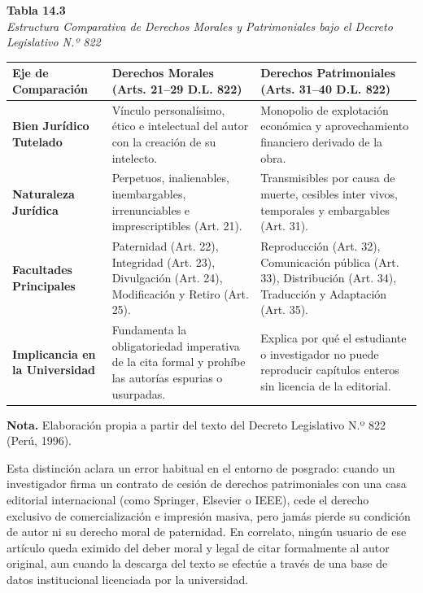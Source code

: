 \begin{table}[htbp]
\centering
\small
\renewcommand{\arraystretch}{1.25}
\textbf{Tabla 14.3}\\[0.15cm]
\textit{Estructura Comparativa de Derechos Morales y Patrimoniales bajo el Decreto Legislativo N.º 822}\\[0.25cm]
\begin{tabularx}{\textwidth}{p{3.0cm}X X}
\toprule
\textbf{Eje de Comparación} & \textbf{Derechos Morales (Arts. 21--29 D.L. 822)} & \textbf{Derechos Patrimoniales (Arts. 31--40 D.L. 822)} \\
\midrule
\textbf{Bien Jurídico Tutelado} & Vínculo personalísimo, ético e intelectual del autor con la creación de su intelecto. & Monopolio de explotación económica y aprovechamiento financiero derivado de la obra. \\
\textbf{Naturaleza Jurídica} & Perpetuos, inalienables, inembargables, irrenunciables e imprescriptibles (Art. 21). & Transmisibles por causa de muerte, cesibles inter vivos, temporales y embargables (Art. 31). \\
\textbf{Facultades Principales} & Paternidad (Art. 22), Integridad (Art. 23), Divulgación (Art. 24), Modificación y Retiro (Art. 25). & Reproducción (Art. 32), Comunicación pública (Art. 33), Distribución (Art. 34), Traducción y Adaptación (Art. 35). \\
\textbf{Implicancia en la Universidad} & Fundamenta la obligatoriedad imperativa de la cita formal y prohíbe las autorías espurias o usurpadas. & Explica por qué el estudiante o investigador no puede reproducir capítulos enteros sin licencia de la editorial. \\
\bottomrule
\end{tabularx}
\vspace{0.15cm}
\raggedright \scriptsize \textbf{Nota.} Elaboración propia a partir del texto del Decreto Legislativo N.º 822 (Perú, 1996).
\end{table}

Esta distinción aclara un error habitual en el entorno de posgrado: cuando un investigador firma un contrato de cesión de derechos patrimoniales con una casa editorial internacional (como Springer, Elsevier o IEEE), cede el derecho exclusivo de comercialización e impresión masiva, pero jamás pierde su condición de autor ni su derecho moral de paternidad. En correlato, ningún usuario de ese artículo queda eximido del deber moral y legal de citar formalmente al autor original, aun cuando la descarga del texto se efectúe a través de una base de datos institucional licenciada por la universidad.

